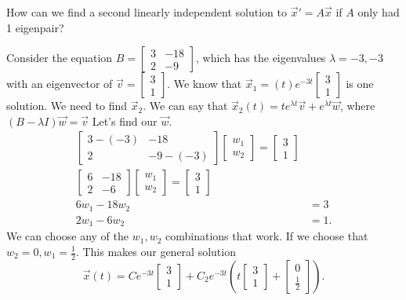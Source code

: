 How can we find a second linearly independent solution to $\vec{x}'=A\vec{x}$ if $A$ only had 1 eigenpair?
\begin{eg}
  Consider the equation $B=\begin{bmatrix} 3&-18\\2&-9 \end{bmatrix} $, which has the eigenvalues $\lambda=-3,-3$ with an eigenvector of $\vec{v}=\begin{bmatrix} 3\\1 \end{bmatrix} $. We know that $\vec{x}_1=(t)e^{-3t}\begin{bmatrix} 3\\1 \end{bmatrix} $ is one solution. We need to find $\vec{x}_2$. We can say that $\vec{x}_2(t)=te^{\lambda t}\vec{v}+e^{\lambda t}\vec{w}$, where $(B-\lambda I)\vec{w}=\vec{v}$ Let's find our $\vec{w}$.
  \begin{align*}
    \begin{bmatrix} 3-(-3)&-18\\2&-9-(-3) \end{bmatrix} \begin{bmatrix} w_1\\w_2 \end{bmatrix} =\begin{bmatrix} 3\\1 \end{bmatrix} \\
    \begin{bmatrix} 6&-18\\2&-6 \end{bmatrix} \begin{bmatrix} w_1\\w_2 \end{bmatrix} =\begin{bmatrix} 3\\1 \end{bmatrix} \\
    6w_1-18w_2&=3\\
    2w_1-6w_2&=1
  .\end{align*}
  We can choose any of the $w_1,w_2$ combinations that work. If we choose that $w_2=0,w_1=\frac{1}{2}$. This makes our general solution \[
    \vec{x}(t)=Ce^{-3t}\begin{bmatrix} 3\\1 \end{bmatrix} +C_2e^{-3t}\left( t\begin{bmatrix} 3\\1 \end{bmatrix} +\begin{bmatrix} 0\\\frac{1}{2} \end{bmatrix}  \right) 
  .\] 
\end{eg}
